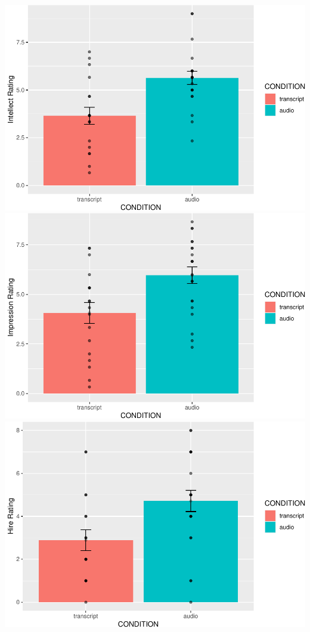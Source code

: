 \documentclass[
  english,
  man]{apa6}
\begin{document}
\includegraphics{semester-project.csf_files/figure-latex/unnamed-chunk-2-1.pdf}
\includegraphics{semester-project.csf_files/figure-latex/unnamed-chunk-3-1.pdf}
\includegraphics{semester-project.csf_files/figure-latex/unnamed-chunk-4-1.pdf}
\end{document}
